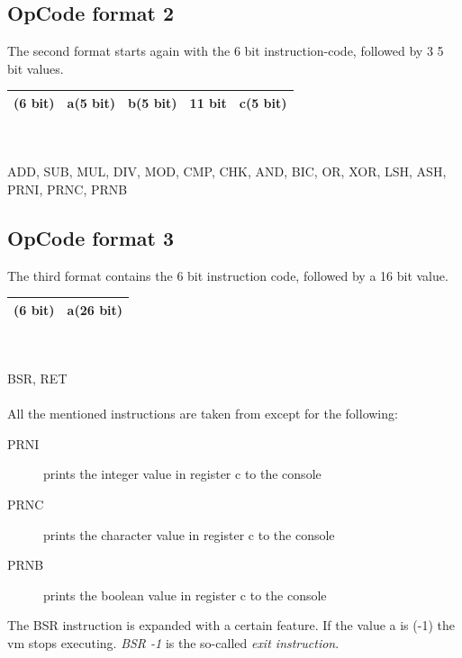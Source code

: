 \subsection{OpCode format 2}

The second format starts again with the 6 bit instruction-code, followed by 3 5
bit values. \\
\begin{tabular}{| p{1.5cm} | p{1.25cm} | p{1.25cm} | p{2.75cm} | p{} |}
			\hline
			(6 bit) & a(5 bit) & b(5 bit) & 11 bit & c(5 bit) \\ 
			\hline  
\end{tabular}
\\ \\
ADD, SUB, MUL, DIV, MOD, CMP, CHK, AND, BIC, OR, XOR, LSH, ASH, PRNI, PRNC, PRNB

\subsection{OpCode format 3}
The third format contains the 6 bit instruction code, followed by a 16 bit
value. \\
\begin{tabular}{| p{1.5cm} | p{6.5cm} |}
			\hline
			(6 bit) & a(26 bit) \\ 
			\hline  
\end{tabular}
\\ \\
BSR, RET
\\ \\
All the mentioned instructions are taken from \cite{wirth}
except for the following:
\begin{description}
\item[PRNI] prints the integer value in register c to the console
\item[PRNC] prints the character value in register c to the console
\item[PRNB] prints the boolean value in register c to the console
\end{description}
The BSR instruction is expanded with a certain feature. If the value a is (-1)
the vm stops executing. \emph{BSR -1} is the so-called \emph{exit instruction}. 

